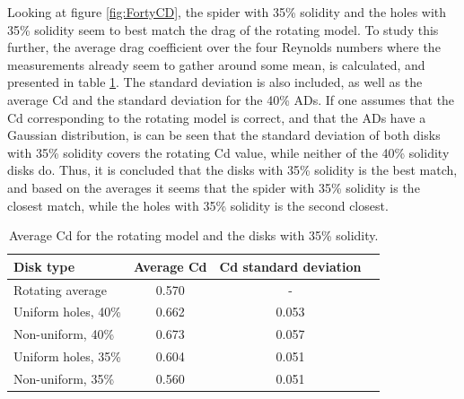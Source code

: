 Looking at figure \ref{fig:FortyCD}, the \gls{spider} with 35\% solidity and the \gls{holes} with 35\% solidity seem to best match the drag of the rotating model. To study this further, the average drag coefficient over the four Reynolds numbers where the measurements already seem to gather around some mean, is calculated, and presented in table \ref{tab:AvgCD}. The standard deviation is also included, as well as the average Cd and the standard deviation for the 40\% \gls{AD}s. If one assumes that the Cd corresponding to the rotating model is correct, and that the \gls{AD}s have a Gaussian distribution, is can be seen that the standard deviation of both disks with 35\% solidity covers the rotating Cd value, while neither of the 40\% solidity disks do. Thus, it is concluded that the disks with 35\% solidity is the best match, and based on the averages it seems that the \gls{spider} with 35\% solidity is the closest match, while the \gls{holes} with 35\% solidity is the second closest.


\begin{table}
    \centering
    \begin{tabular}{l c c r}
         Disk type & Average Cd & Cd standard deviation \\
         \hline
         Rotating average & 0.570 & - \\
         Uniform holes, 40\% & 0.662 & 0.053 \\
         Non-uniform, 40\% & 0.673 & 0.057 \\
         Uniform holes, 35\% & 0.604 & 0.051 \\
         Non-uniform, 35\% & 0.560 & 0.051 \\
    \end{tabular}
    \caption{Average Cd for the rotating model and the disks with 35\% solidity.}
    \label{tab:AvgCD}
\end{table}










